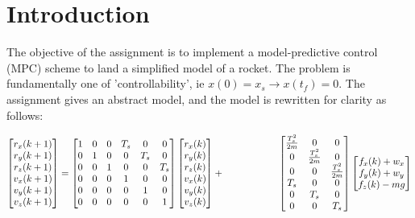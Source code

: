 \documentclass[conference, tikz]{IEEEtran}
\begin{document}
\section{Introduction}
The objective of the assignment is to implement a model-predictive control (MPC) scheme to land a simplified model of a rocket. 
The problem is fundamentally one of 'controllability', ie $x(0) = x_s \rightarrow x(t_f) = 0$. The assignment gives an abstract model, and the model is rewritten for clarity as follows:
\begin{center}
\begin{equation}
    \begin{bmatrix}
        r_x(k+1)\\
        r_y(k+1)\\
        r_z(k+1)\\
        v_x(k+1)\\
        v_y(k+1)\\
        v_z(k+1)\\
    \end{bmatrix}
    =
    \begin{bmatrix}
       1 & 0 & 0 & T_s & 0 & 0\\
       0 & 1 & 0 & 0 & T_s & 0\\
       0 & 0 & 1 & 0 & 0 & T_s\\
       0 & 0 & 0 & 1 & 0 & 0\\
       0 & 0 & 0 & 0 & 1 & 0\\
       0 & 0 & 0 & 0 & 0 & 1
    \end{bmatrix}
    \begin{bmatrix}
        r_x(k)\\
        r_y(k)\\
        r_z(k)\\
        v_x(k)\\
        v_y(k)\\
        v_z(k)\\
    \end{bmatrix}
    +
    \hspace*{2cm}

    \begin{bmatrix}
        \frac{T_s^2}{2m} & 0 & 0\\
        0 & \frac{T_s^2}{2m} & 0\\
        0 & 0 & \frac{T_s^2}{2m}\\
        T_s & 0 & 0\\
        0 & T_s & 0\\
        0 & 0 & T_s
    \end{bmatrix}
    \begin{bmatrix}
        f_x(k)+w_x\\
        f_y(k)+w_y\\
        f_z(k)-mg\\
    \end{bmatrix}
    \label{eq:1}
\end{equation}
\end{center}
\end{document}
